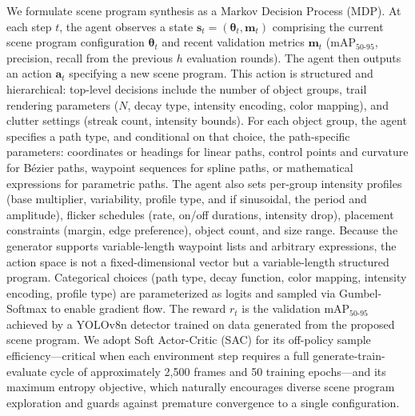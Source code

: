 \documentclass[12pt]{article}
\begin{document}
We formulate scene program synthesis as a Markov Decision Process (MDP). At each step $t$, the agent observes a state $\boldsymbol{s}_t = (\boldsymbol{\theta}_t, \boldsymbol{m}_t)$ comprising the current scene program configuration $\boldsymbol{\theta}_t$ and recent validation metrics $\boldsymbol{m}_t$ (mAP$_{50\text{-}95}$, precision, recall from the previous $h$ evaluation rounds). The agent then outputs an action $\boldsymbol{a}_t$ specifying a new scene program. This action is structured and hierarchical: top-level decisions include the number of object groups, trail rendering parameters ($N$, decay type, intensity encoding, color mapping), and clutter settings (streak count, intensity bounds). For each object group, the agent specifies a path type, and conditional on that choice, the path-specific parameters: coordinates or headings for linear paths, control points and curvature for B\'{e}zier paths, waypoint sequences for spline paths, or mathematical expressions for parametric paths. The agent also sets per-group intensity profiles (base multiplier, variability, profile type, and if sinusoidal, the period and amplitude), flicker schedules (rate, on/off durations, intensity drop), placement constraints (margin, edge preference), object count, and size range. Because the generator supports variable-length waypoint lists and arbitrary expressions, the action space is not a fixed-dimensional vector but a variable-length structured program. Categorical choices (path type, decay function, color mapping, intensity encoding, profile type) are parameterized as logits and sampled via Gumbel-Softmax to enable gradient flow. The reward $r_t$ is the validation mAP$_{50\text{-}95}$ achieved by a YOLOv8n detector trained on data generated from the proposed scene program. We adopt Soft Actor-Critic (SAC) \citep{Haarnoja2018SAC} for its off-policy sample efficiency---critical when each environment step requires a full generate-train-evaluate cycle of approximately 2,500 frames and 50 training epochs---and its maximum entropy objective, which naturally encourages diverse scene program exploration and guards against premature convergence to a single configuration.
\end{document}
